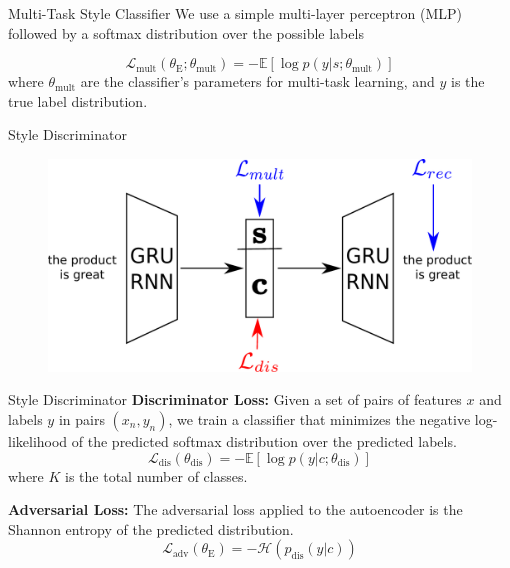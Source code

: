 \documentclass[aspectratio=169]{beamer}
\newcommand{\loss}[1]{\mathcal{L}_{\text{#1}}}
\newcommand{\param}[1]{\theta_{\text{#1}}}
\begin{document}
\begin{frame}{Multi-Task Style Classifier}
	We use a simple multi-layer perceptron (MLP) followed by a softmax distribution over the possible labels

	\begin{equation} \label{eqn:multi-task-loss}
		\loss{mult}(\param{E};\param{mult}) = - \mathbb{E} [\log p(y|s;\param{mult})]
	\end{equation}
	where $\param{mult}$ are the classifier's parameters for multi-task learning, and $y$ is the true label distribution.
\end{frame}

\begin{frame}{Style Discriminator}
	\centering
	\begin{figure}[ht]
		\includegraphics[width=\textwidth]{images/overview-training-3}
	\end{figure}
\end{frame}

\begin{frame}{Style Discriminator}
	\textbf{Discriminator Loss:}
	Given a set of pairs of features $x$ and labels $y$ in pairs $(x_n, y_n)$, we train a classifier that minimizes the negative log-likelihood of the predicted softmax distribution over the predicted labels.
	\begin{equation}
		\loss{dis}(\param{dis}) = - \mathbb{E} [\log p(y|c;\param{dis})]
	\end{equation}
	where $K$ is the total number of classes.

	\textbf{Adversarial Loss:}
	The adversarial loss applied to the autoencoder is the Shannon entropy of the predicted distribution.
	\begin{equation}
		\loss{adv}(\param{E}) = - \mathcal{H}(p_\text{dis}(y|c))
	\end{equation}
\end{frame}
\end{document}
